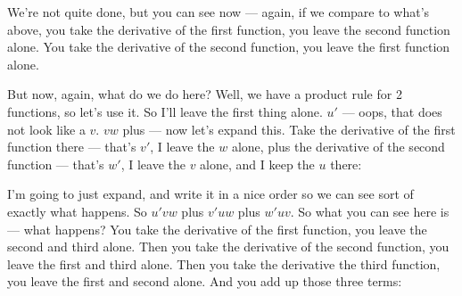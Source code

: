 \documentclass[pdftex, brazil, 12pt, twoside]{article}
\begin{document}
We're not quite done, but you can see now ---
again, if we compare to what's above,
you take the derivative of the first function,
you leave the second function alone.
You take the derivative of the second function,
you leave the first function alone.

But now, again, what do we do here?
Well, we have a product rule for 2 functions, so let's use it.
So I'll leave the first thing alone. $u'$ ---
oops, that does not look like a $v$. $vw$ plus --- now let's
expand this.
Take the derivative of the first function there ---
that's $v'$, I leave the $w$ alone,
plus the derivative of the second function --- that's
$w'$, I leave the $v$ alone, and I keep the $u$ there:

\begin{figure}[H]
  \begin{center}
  \end{center}
\end{figure}

I'm going to just expand, and write it in a nice order
so we can see sort of exactly what happens.
So $u'vw$ plus $v'uw$ plus $w'uv$.
So what you can see here is --- what happens?
You take the derivative of the first function,
you leave the second and third alone.
Then you take the derivative of the second function,
you leave the first and third alone.
Then you take the derivative the third function,
you leave the first and second alone.
And you add up those three terms:
\end{document}
